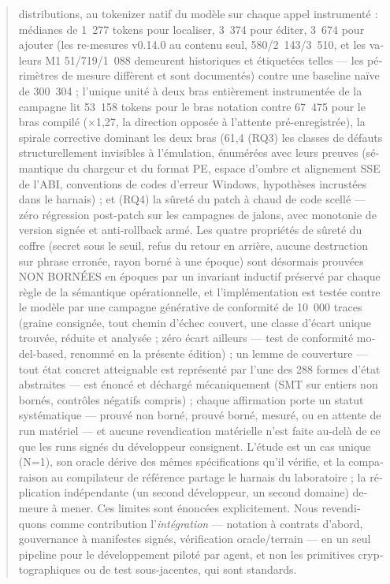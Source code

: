 \documentclass[11pt,a4paper]{article}
\begin{document}
\begin{otherlanguage}{french}
\begin{abstract}
distributions, au tokenizer natif du modèle sur chaque appel instrumenté :
médianes de 1~277 tokens pour localiser, 3~374 pour éditer, 3~674 pour
ajouter (les re-mesures v0.14.0 au contenu seul, 580/2~143/3~510, et les
valeurs M1 51/719/1~088 demeurent historiques et étiquetées telles — les
périmètres de mesure diffèrent et sont documentés) contre une baseline
naïve de 300~304 ; l'unique unité à deux
bras entièrement instrumentée de la campagne lit 53~158 tokens pour le
bras notation contre 67~475 pour le bras compilé (×1,27, la direction
opposée à l'attente pré-enregistrée), la spirale corrective dominant les
deux bras (61,4 %
(RQ3) les classes de défauts structurellement invisibles à l'émulation,
énumérées avec leurs preuves (sémantique du chargeur et du format PE,
espace d'ombre et alignement SSE de l'ABI, conventions de codes d'erreur
Windows, hypothèses incrustées dans le harnais) ; et (RQ4) la sûreté du
patch à chaud de code scellé — zéro régression post-patch sur les
campagnes de jalons, avec monotonie de version signée et anti-rollback
armé. Les quatre propriétés de sûreté du coffre (secret sous le seuil, refus du retour en arrière, aucune destruction sur phrase erronée, rayon borné à une époque) sont désormais prouvées NON BORNÉES en époques par un invariant inductif préservé par chaque règle de la sémantique opérationnelle, et l'implémentation est testée contre le modèle par une campagne générative de conformité de 10~000 traces (graine consignée, tout chemin d'échec couvert, une classe d'écart unique trouvée, réduite et analysée ; zéro écart ailleurs — test de conformité model-based, renommé en la présente édition) ; un lemme de couverture — tout état concret atteignable est représenté par l'une des 288 formes d'état abstraites — est énoncé et déchargé mécaniquement (SMT sur entiers non bornés, contrôles négatifs compris) ; chaque affirmation porte un statut systématique — prouvé non borné, prouvé borné, mesuré, ou en attente de run matériel — et aucune revendication matérielle n'est faite au-delà de ce que les runs signés du développeur consignent. L'étude est un cas unique (N=1), son oracle dérive des mêmes
spécifications qu'il vérifie, et la comparaison au compilateur de référence
partage le harnais du laboratoire ; la réplication indépendante (un second
développeur, un second domaine) demeure à mener. Ces limites sont
énoncées explicitement. Nous
revendiquons comme contribution l'\emph{intégration} — notation à
contrats d'abord, gouvernance à manifestes signés, vérification
oracle/terrain — en un seul pipeline pour le développement piloté par
agent, et non les primitives cryptographiques ou de test sous-jacentes,
qui sont standards.
\end{abstract}
\end{otherlanguage}
\end{document}
